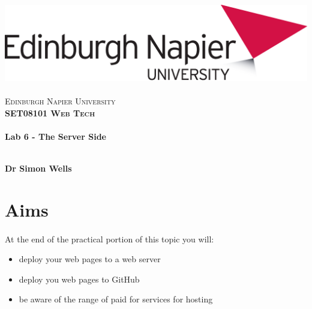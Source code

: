 \documentclass[10pt, a4paper, twosize]{article}
\begin{document}

\begin{titlepage}
\vspace*{5cm}
\begin{center}
\includegraphics[width=.5\textwidth]{images/EdNapUniLogoCMYK}~\\[1cm]

\textsc{\Large Edinburgh Napier University}\\[1.5cm]

\textsc{\LARGE \bfseries SET08101 Web Tech}\\[0.5cm]

\hrulefill \\[0.4cm]
{\huge \bfseries Lab 6 - The Server Side \\[0.4cm] }
\hrulefill \\[1.5cm]

\begin{minipage}{0.4\textwidth}
\begin{flushleft} \large
\textbf{Dr Simon Wells} \\
\end{flushleft}
\end{minipage}

\vfill

\end{center}
\end{titlepage}




%

\section{Aims}
\paragraph{} At the end of the practical portion of this topic you will:

\begin{itemize}
\item deploy your web pages to a web server
\item deploy you web pages to GitHub
\item be aware of the range of paid for services for hosting
\end{itemize}
\end{document}
